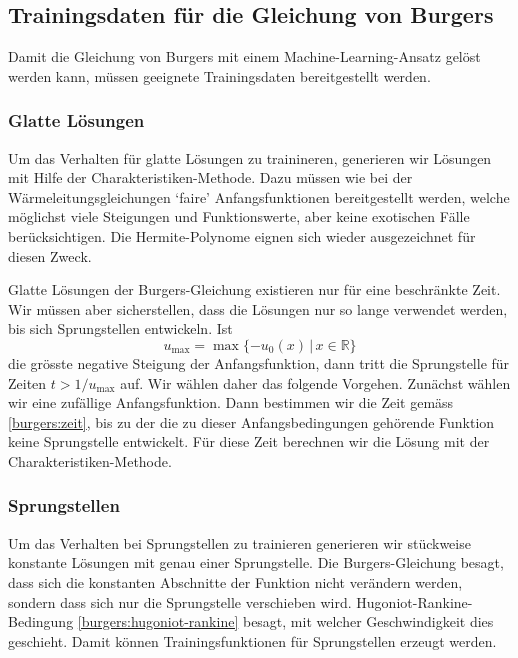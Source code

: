 %
%
%
\subsection{Trainingsdaten für die Gleichung von Burgers\label{burgers:training}}
Damit die Gleichung von Burgers mit einem Machine-Learning-Ansatz gelöst
werden kann, müssen geeignete Trainingsdaten bereitgestellt werden.


\subsubsection{Glatte Lösungen}
Um das Verhalten für glatte Lösungen zu trainineren, generieren
wir Lösungen mit Hilfe der Charakteristiken-Methode.
Dazu müssen wie bei der Wärmeleitungsgleichungen `faire' Anfangsfunktionen 
bereitgestellt werden, welche möglichst viele Steigungen und Funktionswerte,
aber keine exotischen Fälle berücksichtigen.
Die Hermite-Polynome eignen sich wieder ausgezeichnet für diesen Zweck.

Glatte Lösungen der Burgers-Gleichung existieren nur für eine beschränkte Zeit.
Wir müssen aber sicherstellen, dass die Lösungen nur so lange verwendet
werden, bis sich Sprungstellen entwickeln.
Ist
\begin{equation}
u_{\text{max}} = \max \{ -u_0(x)\,|\, x\in\mathbb R\}
\label{burgers:zeit}
\end{equation}
die grösste negative Steigung der Anfangsfunktion, dann tritt die Sprungstelle
für Zeiten $t> 1/u_{\text{max}}$ auf.
Wir wählen daher das folgende Vorgehen.
Zunächst wählen wir eine zufällige Anfangsfunktion.
Dann bestimmen wir die Zeit
gemäss \eqref{burgers:zeit}, bis zu der die zu dieser Anfangsbedingungen
gehörende Funktion keine Sprungstelle entwickelt.
Für diese Zeit berechnen wir die Lösung mit der Charakteristiken-Methode.

\subsubsection{Sprungstellen}
Um das Verhalten bei Sprungstellen zu trainieren generieren wir
stückweise konstante Lösungen mit genau einer Sprungstelle.
Die Burgers-Gleichung besagt, dass sich die konstanten Abschnitte
der Funktion nicht verändern werden, sondern dass sich nur die Sprungstelle
verschieben wird.
Hugoniot-Rankine-Bedingung \eqref{burgers:hugoniot-rankine} besagt,
mit welcher Geschwindigkeit dies geschieht.
Damit können Trainingsfunktionen für Sprungstellen erzeugt werden.

